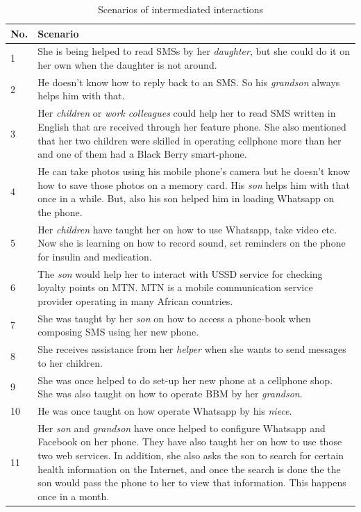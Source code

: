 \begin{table}[h!]
  \begin{center}
    \caption{Scenarios of intermediated interactions}
    \label{table:intermediated}
	\begin{tabular}{|p{1cm}|p{12cm}|}
		\hline
		 \textbf{No.}&\textbf{Scenario}\\
		\hline
		 1& She is being helped to read SMSs by her \emph{daughter}, but she could do it on her own when the daughter is not around. \\
		\hline
		2&He doesn’t know how to reply back to an SMS. So his \emph{grandson} always helps him with that.\\
	\hline
	  3&Her \emph{children} or  \emph{work colleagues} could help her to read SMS written in English that are received through her feature phone. She also mentioned that her two children were skilled in operating cellphone more than her and one of them had a Black Berry smart-phone.\\
	  \hline
	  4&He can take photos using his mobile phone’s camera but he doesn't know how to save those photos on a memory card. His \emph{son} helps him with that once in a while. But, also his son helped him in loading Whatsapp on the phone.\\
	  \hline
	  5&Her \emph{children} have taught her on how to use Whatsapp, take video etc. Now she is learning on how to record sound, set reminders on the phone for insulin and medication.\\
	 \hline
	 6&The \emph{son} would help her to interact with USSD service for checking loyalty points on MTN. MTN is a mobile communication service provider operating in many African countries.\\
	 \hline
	7&She was taught by  her \emph{son} on how to access a phone-book when composing SMS using her new phone.\\
	\hline
	8&She receives assistance from her \emph{helper} when she wants to send messages to her children.\\
	\hline
	9&She was once helped to do set-up her new phone at a cellphone shop. She was also taught on how to operate BBM by her \emph{grandson}.\\
	\hline
	10& He was once taught on how operate Whatsapp by his \emph{niece}.\\
	\hline
	11&Her \emph{son} and \emph{grandson} have once helped to configure Whatsapp and Facebook on her phone. They have also taught her on how to use those two web services. In addition, she also asks the son to search for certain health information on the Internet, and once the search is done the the son would pass the phone to her to view that information. This happens once in a month.\\

\end{tabular}
\end{center}
\end{table}
